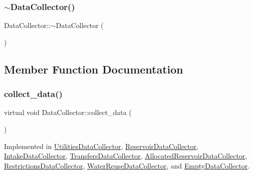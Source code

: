 \subsubsection{\texorpdfstring{$\sim$\+Data\+Collector()}{~DataCollector()}}
{\footnotesize\ttfamily Data\+Collector\+::$\sim$\+Data\+Collector (\begin{DoxyParamCaption}{ }\end{DoxyParamCaption})\hspace{0.3cm}{\ttfamily [virtual]}}



\subsection{Member Function Documentation}
\mbox{\label{classDataCollector_a01486bf58acbe37b203f97b3b9a79c40}} 
\subsubsection{\texorpdfstring{collect\+\_\+data()}{collect\_data()}}
{\footnotesize\ttfamily virtual void Data\+Collector\+::collect\+\_\+data (\begin{DoxyParamCaption}{ }\end{DoxyParamCaption})\hspace{0.3cm}{\ttfamily [pure virtual]}}



Implemented in \mbox{\hyperlink{classUtilitiesDataCollector_ab72c4432d6816beb1f4f4b354fb3023d}{Utilities\+Data\+Collector}}, \mbox{\hyperlink{classReservoirDataCollector_a5c2e1355c40e45b409168e98245eef95}{Reservoir\+Data\+Collector}}, \mbox{\hyperlink{classIntakeDataCollector_aed1610e5419465b35041b05b9f60c212}{Intake\+Data\+Collector}}, \mbox{\hyperlink{classTransfersDataCollector_a2f5c4427699aab547ea0d3b74993752b}{Transfers\+Data\+Collector}}, \mbox{\hyperlink{classAllocatedReservoirDataCollector_a8ef8451d2cc6eb01b205eee75ab93729}{Allocated\+Reservoir\+Data\+Collector}}, \mbox{\hyperlink{classRestrictionsDataCollector_a7d8b6433ec25a53ed50577c2cf89912d}{Restrictions\+Data\+Collector}}, \mbox{\hyperlink{classWaterReuseDataCollector_af4d8d437372c06d84ff889a5288cc96e}{Water\+Reuse\+Data\+Collector}}, and \mbox{\hyperlink{classEmptyDataCollector_a2993f4e00acd2eff18bed2e39108e89f}{Empty\+Data\+Collector}}.


